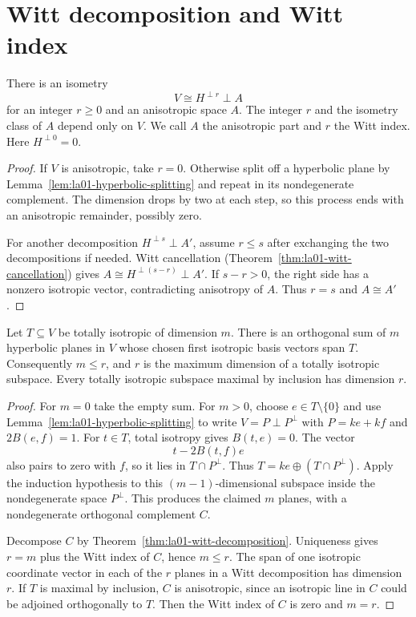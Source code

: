 \section{Witt decomposition and Witt index}

\begin{theorem}
\label{thm:la01-witt-decomposition}
There is an isometry
\[
  V\cong H^{\perp r}\perp A
\]
for an integer \(r\ge 0\) and an anisotropic space \(A\). The
integer \(r\) and the isometry class of \(A\) depend only on \(V\).
We call \(A\) the anisotropic part and \(r\) the Witt index.
Here \(H^{\perp 0}=0\).
\end{theorem}

\begin{proof}
If \(V\) is anisotropic, take \(r=0\). Otherwise split off a
hyperbolic plane by Lemma~\ref{lem:la01-hyperbolic-splitting} and
repeat in its nondegenerate complement. The dimension drops by
two at each step, so this process ends with an anisotropic
remainder, possibly zero.

For another decomposition \(H^{\perp s}\perp A'\), assume
\(r\le s\) after exchanging the two decompositions if needed.
Witt cancellation (Theorem~\ref{thm:la01-witt-cancellation})
gives \(A\cong H^{\perp(s-r)}\perp A'\). If \(s-r>0\), the
right side has a nonzero isotropic vector, contradicting
anisotropy of \(A\). Thus \(r=s\) and \(A\cong A'\).
\end{proof}

\begin{proposition}
\label{prop:la01-witt-index}
Let \(T\subseteq V\) be totally isotropic of dimension \(m\).
There is an orthogonal sum of \(m\) hyperbolic planes in \(V\)
whose chosen first isotropic basis vectors span \(T\).
Consequently \(m\le r\), and \(r\) is the maximum dimension of a
totally isotropic subspace. Every totally isotropic subspace
maximal by inclusion has dimension \(r\).
\end{proposition}

\begin{proof}
For \(m=0\) take the empty sum. For \(m>0\), choose
\(e\in T\setminus\{0\}\) and use
Lemma~\ref{lem:la01-hyperbolic-splitting} to write
\(V=P\perp P^\perp\) with \(P=ke+kf\) and \(2B(e,f)=1\).
For \(t\in T\), total isotropy gives \(B(t,e)=0\). The vector
\[
  t-2B(t,f)e
\]
also pairs to zero with \(f\), so it lies in \(T\cap P^\perp\).
Thus \(T=ke\oplus(T\cap P^\perp)\). Apply the induction
hypothesis to this \((m-1)\)-dimensional subspace inside the
nondegenerate space \(P^\perp\). This produces the claimed \(m\)
planes, with a nondegenerate orthogonal complement \(C\).

Decompose \(C\) by Theorem~\ref{thm:la01-witt-decomposition}.
Uniqueness gives \(r=m\) plus the Witt index of \(C\), hence
\(m\le r\). The span of one isotropic coordinate vector in each
of the \(r\) planes in a Witt decomposition has dimension \(r\).
If \(T\) is maximal by inclusion, \(C\) is anisotropic, since an
isotropic line in \(C\) could be adjoined orthogonally to \(T\).
Then the Witt index of \(C\) is zero and \(m=r\).
\end{proof}

